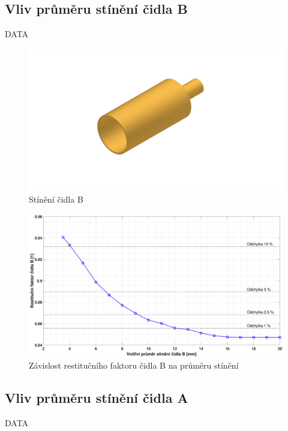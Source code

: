     \newpage
    \subsection{Vliv průměru stínění čidla B}
        DATA
        
        \begin{figure}[ht!]
            \centering
            \includegraphics[width=\textwidth]{400_SIMULACE_KONSTRUKCNICH_UPRAV/Vykresy_rendery/Stineni_B.png}
            \caption{Stínění čidla B}
            \label{fig:stineni-B}
        \end{figure}
        
        
        \begin{figure}[ht!]
            \centering
            \includegraphics*[width=\textwidth, trim={5.9cm 1.0cm 5.8cm 2.0cm}]{400_SIMULACE_KONSTRUKCNICH_UPRAV/Grafy/04_prumer_stineni_B}
            \caption{Závislost restitučního faktoru čidla B na průměru stínění}
            \label{fig:prumer-stineni-B}
        \end{figure}
    
    \newpage
    \subsection{Vliv průměru stínění čidla A}
        DATA
        
